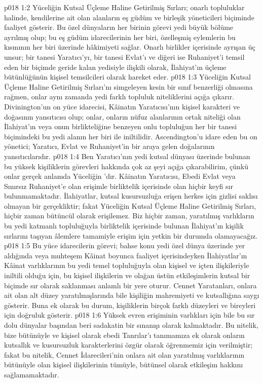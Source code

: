 \vs p018 1:2 Yüceliğin Kutsal Üçleme Haline Getirilmiş Sırları; onarlı topluluklar halinde, kendilerine ait olan alanların eş güdüm ve birleşik yöneticileri biçiminde faaliyet gösterir. Bu özel dünyaların her birinin görevi yedi büyük bölüme ayrılmış olup; bu eş güdüm idarecilerinin her biri, özelleşmiş eylemlerin bu kısmının her biri üzerinde hâkimiyeti sağlar. Onarlı birlikler içerisinde ayrışan üç unsur; bir tanesi Yaratıcı’yı, bir tanesi Evlat’ı ve diğeri ise Ruhaniyet’i temsil eden bir biçimde geride kalan yedisiyle ilişkili olarak, İlahiyat’ın üçleme bütünlüğünün kişisel temsilcileri olarak hareket eder.
\vs p018 1:3 Yüceliğin Kutsal Üçleme Haline Getirilmiş Sırları’nı simgeleyen kesin bir sınıf benzerliği olmasına rağmen, onlar aynı zamanda yedi farklı topluluk niteliklerini açığa çıkarır. Divinington’un on yüce idarecisi, Kâinatın Yaratıcısı’nın kişisel karakteri ve doğasının yansıtıcısı olup; onlar, onların nüfuz alanlarının ortak niteliği olan İlahiyat’ın veya onun birlikteliğine benzeyen onlu topluluğun her bir tanesi biçimindeki bu yedi alanın her biri ile iniltilidir. Ascendington’u idare eden bu on yönetici; Yaratıcı, Evlat ve Ruhaniyet’in bir araya gelen doğalarının yansıtıcılarıdır.
\vs p018 1:4 Ben Yaratıcı’nın yedi kutsal dünyası üzerinde bulunan bu yüksek kişiliklerin görevleri hakkında çok az şeyi açığa çıkarabilirim, çünkü onlar gerçek anlamda Yüceliğin ’dır. Kâinatın Yaratıcısı, Ebedi Evlat veya Sınırsız Ruhaniyet’e olan erişimle birliktelik içerisinde olan hiçbir keyfi sır bulunmamaktadır. İlahiyatlar, kutsal kusursuzluğa erişen herkes için gizlisi saklısı olmayan bir gerçekliktir; fakat Yüceliğin Kutsal Üçleme Haline Getirilmiş Sırları, hiçbir zaman bütüncül olarak erişilemez. Biz hiçbir zaman, yaratılmış varlıkların bu yedi katmanlı topluluğuyla birliktelik içerisinde bulunan İlahiyat’ın kişilik sırlarını taşıyan âlemlere tamamiyle erişim için yetkin bir durumda olamayacağız.
\vs p018 1:5 Bu yüce idarecilerin görevi; bahse konu yedi özel dünya üzerinde yer aldığında veya muhteşem Kâinat boyunca faaliyet içerisindeyken İlahiyatlar’ın Kâinat varlıklarının bu yedi temel topluluğuyla olan kişisel ve içten ilişkileriyle iniltili olduğu için, bu kişisel ilişkilerin ve olağan üstün etkileşimlerin kutsal bir biçimde sır olarak saklanması anlamlı bir yere oturur. Cennet Yaratanları, onlara ait olan alt düzey yaratılmışlarında bile kişiliğin mahremiyeti ve kutsallığına saygı gösterir. Buna ek olarak bu durum, kişiliklerin birçok farklı düzeyleri ve bireyleri için doğruluk gösterir.
\vs p018 1:6 Yüksek evren erişiminin varlıkları için bile bu sır dolu dünyalar başından beri sadakatin bir sınanışı olarak kalmaktadır. Bu nitelik, bize bütünüyle ve kişisel olarak ebedi Tanrılar’ı tanımamıza ek olarak onların kutsallık ve kusursuzluk karakterlerini özgür olarak öğrenmemiz için verilmiştir; fakat bu nitelik, Cennet İdarecileri’nin onlara ait olan yaratılmış varlıklarının bütünüyle olan kişisel ilişkilerinin tümüyle, bütünsel olarak etkileşim hakkını sağlamamaktadır.
